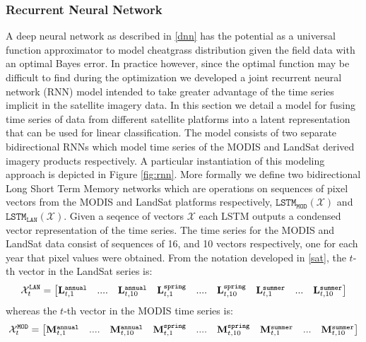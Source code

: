 \def\year{2017}\relax \documentclass[letterpaper]{article}
\begin{document}
\subsubsection{Recurrent Neural Network}
A deep neural network as described in \ref{dnn} has the potential as a universal function approximator to model cheatgrass distribution given the field data with an optimal Bayes error. In practice however, since the optimal function may be difficult to find during the optimization we developed a joint recurrent neural network (RNN) model intended to take greater advantage of the time series implicit in the satellite imagery data. In this section we detail a model for fusing time series of data from different satellite platforms into a latent representation that can be used for linear classification. The model consists of two separate bidirectional RNNs which model time series of the MODIS and LandSat derived imagery products respectively. 
A particular instantiation of this modeling approach is depicted in Figure \ref{fig:rnn}. More formally we define two bidirectional Long Short Term Memory networks  which are operations on sequences of pixel vectors from the MODIS and LandSat platforms respectively,  $\texttt{LSTM}_{\texttt{MOD}}(\mathcal{X})$ and  $\texttt{LSTM}_{\texttt{LAN}}(\mathcal{X})$. Given a seqence of vectors $\mathcal{X}$ each LSTM outputs a condensed vector representation of the time series. The time series for the MODIS and LandSat data consist of sequences of 16, and 10 vectors respectively, one for each year that pixel values were obtained. From the notation developed in \ref{sat}, the $t$-th vector in the LandSat series is:
\begin{equation}{\bf \mathcal{X}}^{\texttt{LAN}}_{t} =
\begin{bmatrix}{\bf L}^{\texttt{annual}}_{t,1}& ....& {\bf L}^{\texttt{annual}}_{t,10}&{\bf L}^{\texttt{spring}}_{t,1}& ....& {\bf L}^{\texttt{spring}}_{t,10}& {\bf L}^{\texttt{summer}}_{t,1}& ...& {\bf L}^{\texttt{summer}}_{t,10}\end{bmatrix}
\end{equation}
whereas the $t$-th vector in the MODIS time series is:
\begin{equation}{\bf \mathcal{X}}^{\texttt{MOD}}_{t} =
\begin{bmatrix}{\bf M}^{\texttt{annual}}_{t,1}& ....& {\bf M}^{\texttt{annual}}_{t,10}&{\bf M}^{\texttt{spring}}_{t,1}& ....& {\bf M}^{\texttt{spring}}_{t,10}& {\bf M}^{\texttt{summer}}_{t,1}& ...& {\bf M}^{\texttt{summer}}_{t,10}\end{bmatrix}
\end{equation}
\end{document}
